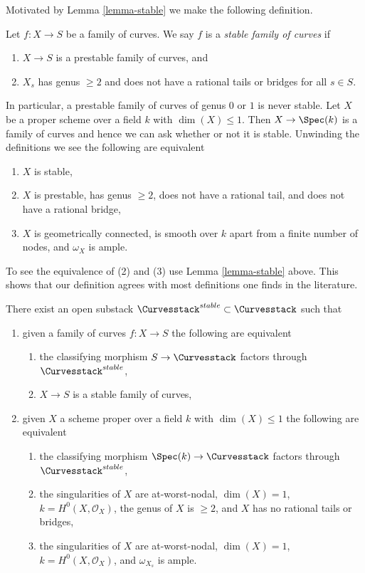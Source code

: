 \noindent
Motivated by Lemma \ref{lemma-stable} we make the following definition.

\begin{definition}
\label{definition-stable}
Let $f : X \to S$ be a family of curves.
We say $f$ is a {\it stable family of curves} if
\begin{enumerate}
\item $X \to S$ is a prestable family of curves, and
\item $X_s$ has genus $\geq 2$ and does not have a rational tails
or bridges for all $s \in S$.
\end{enumerate}
\end{definition}

\noindent
In particular, a prestable family of curves of genus $0$ or $1$ is never
stable.
Let $X$ be a proper scheme over a field $k$ with $\dim(X) \leq 1$.
Then $X \to \Spec(k)$ is a family of curves and hence we can ask
whether or not it is stable. Unwinding the definitions we see
the following are equivalent
\begin{enumerate}
\item $X$ is stable,
\item $X$ is prestable, has genus $\geq 2$, does not have a rational tail,
and does not have a rational bridge,
\item $X$ is geometrically connected, is smooth over $k$
apart from a finite number of nodes, and $\omega_X$ is ample.
\end{enumerate}
To see the equivalence of (2) and (3) use
Lemma \ref{lemma-stable} above.
This shows that our definition agrees with most definitions one finds
in the literature.

\begin{lemma}
\label{lemma-stable-curves}
There exist an open substack $\Curvesstack^{stable} \subset \Curvesstack$
such that
\begin{enumerate}
\item given a family of curves $f : X \to S$ the following are equivalent
\begin{enumerate}
\item the classifying morphism $S \to \Curvesstack$ factors
through $\Curvesstack^{stable}$,
\item $X \to S$ is a stable family of curves,
\end{enumerate}
\item given $X$ a scheme proper over a field $k$ with
$\dim(X) \leq 1$ the following are equivalent
\begin{enumerate}
\item the classifying morphism $\Spec(k) \to \Curvesstack$
factors through $\Curvesstack^{stable}$,
\item the singularities of $X$ are at-worst-nodal, $\dim(X) = 1$,
$k = H^0(X, \mathcal{O}_X)$, the genus of $X$ is $\geq 2$, and
$X$ has no rational tails or bridges,
\item the singularities of $X$ are at-worst-nodal, $\dim(X) = 1$,
$k = H^0(X, \mathcal{O}_X)$, and $\omega_{X_s}$ is ample.
\end{enumerate}
\end{enumerate}
\end{lemma}

